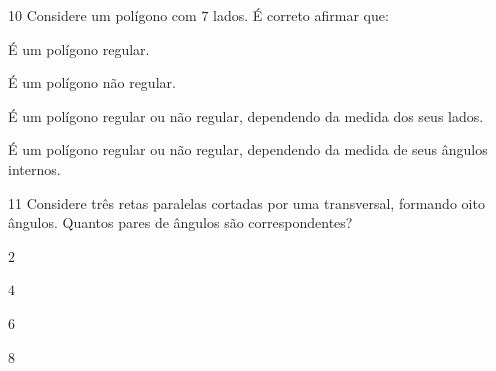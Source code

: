 \num{10} Considere um polígono com $7$ lados. É correto afirmar que:

\begin{escolha}
\item É um polígono regular.
\item É um polígono não regular.
\item É um polígono regular ou não regular, dependendo da medida dos seus
lados.
\item É um polígono regular ou não regular, dependendo da medida de seus
ângulos internos.
\end{escolha}



\num{11} Considere três retas paralelas cortadas por uma transversal,
formando oito ângulos. Quantos pares de ângulos são correspondentes?

\begin{escolha}
\item $2$
\item $4$
\item $6$
\item $8$
\end{escolha}


